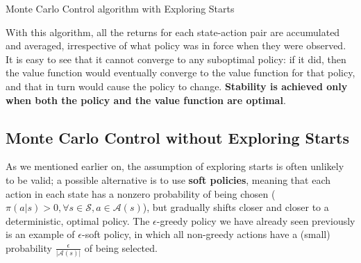 \begin{algorithm}[H]
\SetAlgoLined
{}

 \caption{Monte Carlo Control algorithm with Exploring Starts}
\end{algorithm}

With this algorithm, all the returns for each state-action pair are accumulated and averaged, irrespective of what policy was in force when they were observed. It is easy to see that it cannot converge to any suboptimal policy: if it did, then the value function would eventually converge to the value function for that policy, and that in turn would cause the policy to change. \textbf{Stability is achieved only when both the policy and the value function are optimal}.

\subsection{Monte Carlo Control without Exploring Starts}
As we mentioned earlier on, the assumption of exploring starts is often unlikely to be valid; a possible alternative is to use \textbf{soft policies}, meaning that each action in each state has a nonzero probability of being chosen ($\pi(a \vert s) > 0, \forall s\in\mathcal{S},a\in\mathcal{A}(s)$), but gradually shifts closer and closer to a deterministic, optimal policy. The $\epsilon$-greedy policy we have already seen previously is an example of $\epsilon$-soft policy, in which all non-greedy actions have a (small) probability $\frac{\epsilon}{\left\vert \mathcal{A}(s) \right\vert}$ of being selected.

